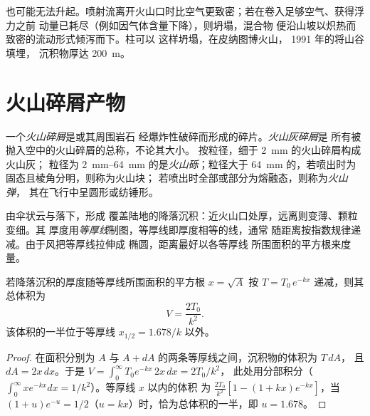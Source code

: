 也可能无法升起。喷射流离开火山口时比空气更致密；若在卷入足够空气、获得浮力之前
动量已耗尽（例如因气体含量下降），则坍塌，混合物
便沿山坡以炽热而致密的流动形式倾泻而下。柱可以
这样坍塌，在皮纳图博火山，
1991 年的将山谷填埋，
沉积物厚达 \qty{200}{m}。

\section{火山碎屑产物}

\begin{definition}[火山灰碎屑与火山碎屑]\label{def:b2:eruptive-styles:tephra}
一个\emph{火山碎屑}是或其周围岩石
经爆炸性破碎而形成的碎片。\emph{火山灰碎屑}是
所有被抛入空中的火山碎屑的总称，不论其大小。
按粒径，细于 \qty{2}{mm} 的火山碎屑构成火山灰；
粒径为 \qtyrange{2}{64}{mm} 的是\emph{火山砾}；粒径大于
\qty{64}{mm} 的，若喷出时为固态且棱角分明，则称为火山块；
若喷出时全部或部分为熔融态，则称为\emph{火山弹}，
其在飞行中呈圆形或纺锤形。
\end{definition}

由伞状云与落下，形成
覆盖陆地的降落沉积：近火山口处厚，远离则变薄、颗粒变细。其
厚度用\emph{等厚线}制图，等厚线即厚度相等的线，通常
随距离按指数规律递减。由于风把等厚线拉伸成
椭圆，距离最好以各等厚线
所围面积的平方根来度量。

\begin{proposition}[指数变薄沉积的体积]\label{prop:b2:eruptive-styles:thinning}
若降落沉积的厚度随等厚线所围面积的平方根 $x = \sqrt A$
按 $T = T_0\,e^{-kx}$ 递减，则其总体积为
\[
V = \frac{2T_0}{k^2}.
\]
该体积的一半位于等厚线 $x_{1/2} = 1.678/k$ 以外。
\end{proposition}

\begin{proof}
在面积分别为 $A$ 与 $A + dA$ 的两条等厚线之间，沉积物的体积为 $T\,dA$，
且 $dA = 2x\,dx$。于是 $V = \int_0^\infty T_0e^{-kx}\,2x\,dx = 2T_0/k^2$，
此处用分部积分（$\int_0^\infty xe^{-kx}dx = 1/k^2$）。等厚线 $x$ 以内的体积
为 $\frac{2T_0}{k^2}[1 - (1 + kx)e^{-kx}]$，当 $(1 +
u)e^{-u} = 1/2$（$u = kx$）时，恰为总体积的一半，即 $u = 1.678$。
\end{proof}

